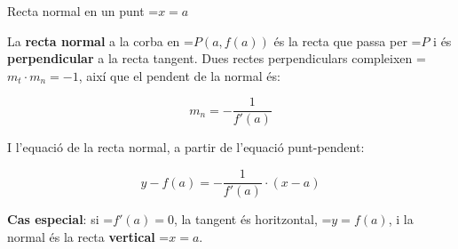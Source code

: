 \documentclass[11pt,a4paper]{article}
\newcommand{\fmm}[1]{\setbox0=\hbox{$#1$}\ifdim\wd0>\linewidth\[#1\]\else\mbox{\box0}\fi}
\newcommand{\fmuline}[1]{\textbf{\color{fmaccent}#1}}
\begin{document}
  
\begin{fmdef}{Recta normal en un punt \fmm{x=a}}
\par\noindent \begin{minipage}[t]{0.48\linewidth}\vspace{0pt}\raggedright La \textbf{recta normal} a la corba en \fmm{P(a,f(a))} és la recta que passa per \fmm{P} i és \textbf{perpendicular} a la recta tangent. Dues rectes perpendiculars compleixen \fmm{m_t\cdot m_n=-1}, així que el pendent de la normal és:

          
\[m_n=-\frac{1}{f'(a)}\]

          

I l'equació de la recta normal, a partir de l'equació punt-pendent:

          
\[y-f(a)=-\frac{1}{f'(a)}\cdot(x-a)\]
\end{minipage}\hfill\begin{minipage}[t]{0.48\linewidth}\vspace{0pt}\raggedright \begin{center}\end{center}\end{minipage}\par\medskip

      
\begin{fmnote}\fmuline{Cas especial}: si \fmm{f'(a)=0}, la tangent és horitzontal, \fmm{y=f(a)}, i la normal és la recta \textbf{vertical} \fmm{x=a}.\end{fmnote}
\end{fmdef}
\end{document}
